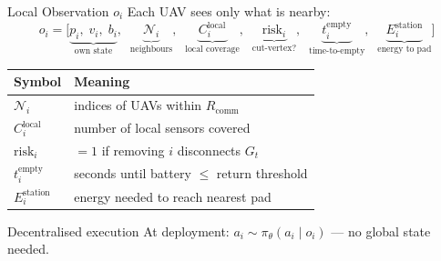 \documentclass[aspectratio=169,12pt]{beamer}
\begin{document}
\begin{frame}{Local Observation $o_i$}
Each UAV sees only what is nearby:
\[
o_i = \bigl[
  \underbrace{p_i,\; v_i,\; b_i}_{\text{own state}},\;\;
  \underbrace{\mathcal{N}_i}_{\text{neighbours}},\;\;
  \underbrace{C_i^{\text{local}}}_{\text{local coverage}},\;\;
  \underbrace{\text{risk}_i}_{\text{cut-vertex?}},\;\;
  \underbrace{t_i^{\text{empty}}}_{\text{time-to-empty}},\;\;
  \underbrace{E_i^{\text{station}}}_{\text{energy to pad}}
\bigr]
\]

\vspace{0.4em}
\begin{tabular}{@{}ll@{}}
\toprule
\textbf{Symbol} & \textbf{Meaning} \\
\midrule
$\mathcal{N}_i$ & indices of UAVs within $R_{\text{comm}}$ \\
$C_i^{\text{local}}$ & number of local sensors covered \\
$\text{risk}_i$ & $=1$ if removing $i$ disconnects $G_t$ \\
$t_i^{\text{empty}}$ & seconds until battery $\le$ return threshold \\
$E_i^{\text{station}}$ & energy needed to reach nearest pad \\
\bottomrule
\end{tabular}

\vspace{0.3em}
\begin{alertblock}{Decentralised execution}
At deployment: $a_i \sim \pi_\theta(a_i \mid o_i)$ --- no global state needed.
\end{alertblock}
\end{frame}
\end{document}
